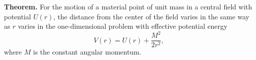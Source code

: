 \textbf{Theorem.} For the motion of a material point of unit mass in a central field with potential $U(r)$, the distance from the center of the field varies in the same way as $r$ varies in the one-dimensional problem with effective potential energy
$$V(r) = U(r) + \frac{M^2}{2r^2},$$
where $M$ is the constant angular momentum.
